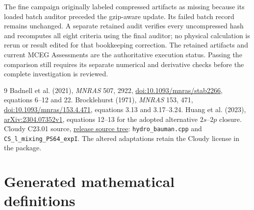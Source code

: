 \documentclass[11pt,a4paper]{article}
\begin{document}
The fine campaign originally labeled compressed artifacts as missing because
its loaded batch auditor preceded the gzip-aware update. Its failed batch
record remains unchanged. A separate retained audit verifies every uncompressed
hash and recomputes all eight criteria using the final auditor; no physical
calculation is rerun or result edited for that bookkeeping correction.
The retained artifacts and current MCEG Assessments are the authoritative
execution status. Passing the comparison still requires its separate numerical
and derivative checks before the complete investigation is reviewed.

\begin{thebibliography}{9}
 Badnell et al. (2021), \emph{MNRAS} 507, 2922,
\href{https://doi.org/10.1093/mnras/stab2266}{doi:10.1093/mnras/stab2266},
equations 6--12 and 22.
 Brocklehurst (1971), \emph{MNRAS} 153, 471,
\href{https://doi.org/10.1093/mnras/153.4.471}{doi:10.1093/mnras/153.4.471},
equations 3.13 and 3.17--3.24.
 Huang et al. (2023),
\href{https://arxiv.org/html/2304.07352v1}{arXiv:2304.07352v1},
equations 12--13 for the adopted alternative $2s$--$2p$ closure.
 Cloudy C23.01 source,
\href{https://gitlab.nublado.org/cloudy/cloudy/-/tree/c23.01/source}{release source tree}:
\texttt{hydro\_bauman.cpp} and \texttt{CS\_l\_mixing\_PS64\_expI}.
The altered adaptations retain the Cloudy license in the package.
\end{thebibliography}
\clearpage
\appendix
\section{Generated mathematical definitions}

\end{document}
